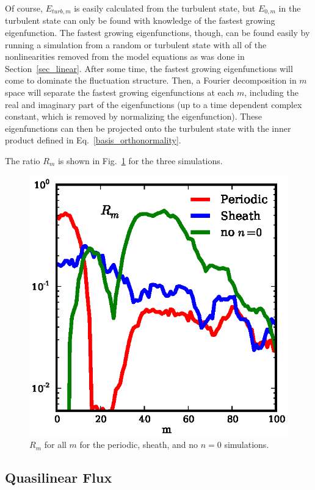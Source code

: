 \documentclass[showpacs,preprintnumbers,amsmath,amssymb,superscriptaddress,aip]{revtex4-1}
\begin{document}
Of course, $E_{turb,m}$ is easily calculated from the turbulent state, but $E_{0,m}$ in the 
turbulent state can only be found with knowledge of the fastest growing eigenfunction. The fastest growing eigenfunctions, though, can be found easily by running a simulation from a random 
or turbulent state with all of the nonlinearities removed from the model equations as was done in Section~\ref{sec_linear}. After some time, the fastest growing eigenfunctions will come to
dominate the fluctuation structure. Then, a Fourier decomposition in $m$ space will separate the fastest growing eigenfunctions at each $m$, including the real and imaginary part
of the eigenfunctions (up to a time dependent complex constant, which is removed by normalizing the eigenfunction). These eigenfunctions can then be projected onto the turbulent state
with the inner product defined in Eq.~\ref{basis_orthonormality}.

The ratio $R_m$ is shown in Fig.~\ref{ratios} for the three simulations.


\begin{figure}[!htbp]
\includegraphics[]{ratios}
\hfil
\caption{$R_m$ for all $m$ for the periodic, sheath, and no $n=0$ simulations.}
\label{ratios}
\end{figure}


\subsection{Quasilinear Flux}
\label{subsec_quasilinear}
\end{document}
